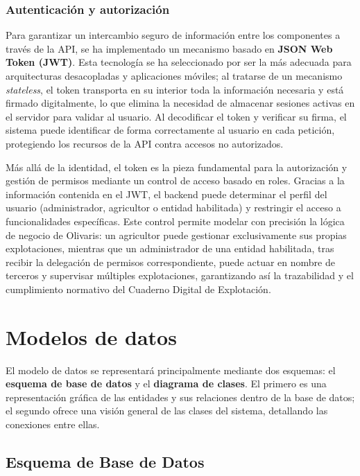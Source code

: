\subsubsection{Autenticación y autorización}

Para garantizar un intercambio seguro de información entre los componentes a través de la API, se ha implementado un mecanismo basado en \textbf{JSON Web Token (JWT)}. Esta tecnología se ha seleccionado por ser la más adecuada para arquitecturas desacopladas y aplicaciones 
móviles; al tratarse de un mecanismo \textit{stateless}, el token transporta en su interior toda la información necesaria y está firmado digitalmente, lo que elimina la necesidad de almacenar sesiones activas en el servidor para validar al usuario. Al decodificar el token 
y verificar su firma, el sistema puede identificar de forma correctamente al usuario en cada petición, protegiendo los recursos de la API contra accesos no autorizados.

Más allá de la identidad, el token es la pieza fundamental para la autorización y gestión de permisos mediante un control de acceso basado en roles. Gracias a la información contenida en el JWT, el backend puede determinar el perfil del usuario (administrador, agricultor o 
entidad habilitada) y restringir el acceso a funcionalidades específicas. Este control permite modelar con precisión la lógica de negocio de Olivaris: un agricultor puede gestionar exclusivamente sus propias explotaciones, mientras que un administrador de una entidad 
habilitada, tras recibir la delegación de permisos correspondiente, puede actuar en nombre de terceros y supervisar múltiples explotaciones, garantizando así la trazabilidad y el cumplimiento normativo del Cuaderno Digital de Explotación.

\section{Modelos de datos}

El modelo de datos se representará principalmente mediante dos esquemas: el \textbf{esquema de base de datos} y el \textbf{diagrama de clases}. El primero es una representación gráfica de las entidades y sus relaciones dentro de la base de datos; el segundo ofrece una 
visión general de las clases del sistema, detallando las conexiones entre ellas.

\subsection{Esquema de Base de Datos}

